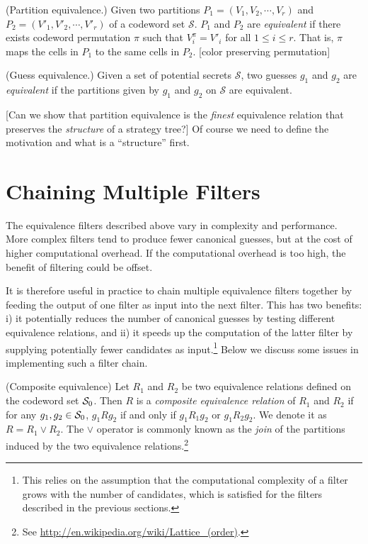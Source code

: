 \begin{definition}
(Partition equivalence.) Given two partitions $P_1 = (V_1, V_2, \cdots, V_r)$ and $P_2 = (V'_1, V'_2, \cdots, V'_r)$ of a codeword set $\mathcal{S}$. $P_1$ and $P_2$ are \emph{equivalent} if there exists codeword permutation $\pi$ such that $V_i^\pi = V'_i$ for all $1 \le i \le r$. That is, $\pi$ maps the cells in $P_1$ to the same cells in $P_2$. [color preserving permutation]
\end{definition}

\begin{definition}
(Guess equivalence.) Given a set of potential secrets $\mathcal{S}$, two guesses $g_1$ and $g_2$ are \emph{equivalent} if the partitions given by $g_1$ and $g_2$ on $\mathcal{S}$ are equivalent.
\end{definition}

[Can we show that partition equivalence is the \emph{finest} equivalence relation that preserves the \emph{structure} of a strategy tree?] Of course we need to define the motivation and what is a ``structure'' first.

\section{Chaining Multiple Filters}

The equivalence filters described above vary in complexity and performance. More complex filters tend to produce fewer canonical guesses, but at the cost of higher computational overhead. If the computational overhead is too high, the benefit of filtering could be offset.

It is therefore useful in practice to chain multiple equivalence filters together by feeding the output of one filter as input into the next filter. This has two benefits: i) it potentially reduces the number of canonical guesses by testing different equivalence relations, and ii) it speeds up the computation of the latter filter by supplying potentially fewer candidates as input.\footnote{This relies on the assumption that the computational complexity of a filter grows with the number of candidates, which is satisfied for the filters described in the previous sections.}
Below we discuss some issues in implementing such a filter chain.

\begin{definition}
(Composite equivalence) Let $R_1$ and $R_2$ be two equivalence relations defined on the codeword set $\mathcal{S}_0$. Then $R$ is a \emph{composite equivalence relation} of $R_1$ and $R_2$ if for any $g_1, g_2 \in \mathcal{S}_0$, $g_1 R g_2$ if and only if $g_1 R_1 g_2$ or $g_1 R_2 g_2$. We denote it as $R = R_1 \vee R_2$. The $\vee$ operator is commonly known as the \emph{join} of the partitions induced by the two equivalence relations.\footnote{See \url{http://en.wikipedia.org/wiki/Lattice\_(order)}.}
\end{definition}

